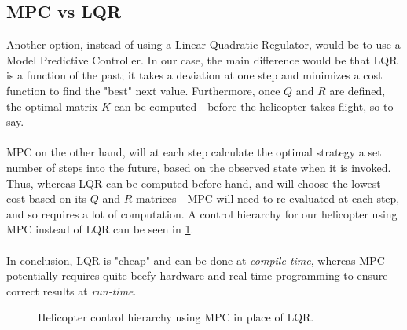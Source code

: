 \subsection{MPC vs LQR}
Another option, instead of using a Linear Quadratic Regulator, would be to use a Model Predictive Controller. In our case, the main difference would be that LQR is a function of the past; it takes a deviation at one step and minimizes a cost function to find the "best" next value. Furthermore, once $Q$ and $R$ are defined, the optimal matrix $K$ can be computed - before the helicopter takes flight, so to say.\\
\\
MPC on the other hand, will at each step calculate the optimal strategy a set number of steps into the future, based on the observed state when it is invoked. Thus, whereas LQR can be computed before hand, and will choose the lowest cost based on its $Q$ and $R$ matrices - MPC will need to re-evaluated at each step, and so requires a lot of computation. A control hierarchy for our helicopter using MPC instead of LQR can be seen in \cref{fig:model_predictive}.\\
\\
In conclusion, LQR is "cheap" and can be done at \textit{compile-time}, whereas MPC potentially requires quite beefy hardware and real time programming to ensure correct results at \textit{run-time}.
\begin{figure}
    \centering
    \caption{Helicopter control hierarchy using MPC in place of LQR.}
    \label{fig:model_predictive}
\end{figure}